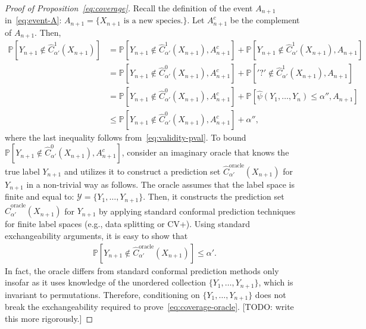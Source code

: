 \documentclass[11pt]{article}
\renewcommand{\P}[1]{\mathbb{P}\left[#1\right]}
\begin{document}
\begin{proof}[Proof of Proposition~\ref{eq:coverage}]
Recall the definition of the event $A_{n+1}$ in~\eqref{eq:event-A}: $A_{n+1} = \{X_{n+1} \text{ is a new species.}\}$. Let $A^c_{n+1}$ be the complement of $A_{n+1}$. Then,
\begin{align*}
  \P{ Y_{n+1} \notin \hat{C}^1_{\alpha'}(X_{n+1})}
  & = \P{ Y_{n+1} \notin \hat{C}^1_{\alpha'}(X_{n+1}), A^c_{n+1}} + \P{ Y_{n+1} \notin \hat{C}^1_{\alpha'}(X_{n+1}), A_{n+1}} \\
  & = \P{ Y_{n+1} \notin \hat{C}^0_{\alpha'}(X_{n+1}), A^c_{n+1}} + \P{ '?' \notin \hat{C}^1_{\alpha'}(X_{n+1}), A_{n+1}} \\
  & = \P{ Y_{n+1} \notin \hat{C}^0_{\alpha'}(X_{n+1}), A^c_{n+1}} + \P{ \hat{\psi}(Y_1,\ldots,Y_n) \leq \alpha'',  A_{n+1}} \\
  & \leq \P{ Y_{n+1} \notin \hat{C}^0_{\alpha'}(X_{n+1}), A^c_{n+1}} + \alpha'',
\end{align*}
where the last inequality follows from~\eqref{eq:validity-pval}.
To bound $\P{ Y_{n+1} \notin \hat{C}^0_{\alpha'}(X_{n+1}), A^c_{n+1}}$, consider an imaginary oracle that knows the true label $Y_{n+1}$ and utilizes it to construct a prediction set $\hat{C}^{\text{oracle}}_{\alpha'}(X_{n+1})$ for $Y_{n+1}$ in a non-trivial way as follows.
The oracle assumes that the label space is finite and equal to: $\mathcal{Y} = \{Y_1, \ldots, Y_{n+1}\}$. Then, it constructs the prediction set $\hat{C}^{\text{oracle}}_{\alpha'}(X_{n+1})$ for $Y_{n+1}$ by applying standard conformal prediction techniques for finite label spaces (e.g., data splitting or CV+).
Using standard exchangeability arguments, it is easy to show that
\begin{align} \label{eq:coverage-oracle}
  \P{ Y_{n+1} \notin \hat{C}^{\text{oracle}}_{\alpha'}(X_{n+1})} \leq \alpha'.
\end{align}
In fact, the oracle differs from standard conformal prediction methods only insofar as it uses knowledge of the unordered collection $\{Y_1, \ldots, Y_{n+1}\}$, which is invariant to permutations. Therefore, conditioning on $\{Y_1, \ldots, Y_{n+1}\}$ does not break the exchangeability required to prove~\eqref{eq:coverage-oracle}.
{\color{red}[TODO: write this more rigorously.]}


\end{proof}
\end{document}
